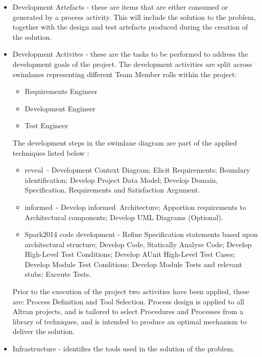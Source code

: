 \documentclass{report}
\newcommand{\spark}[0]{{\sc Spark}}
\newcommand{\reveal}[0]{{\sc reveal}\texttrademark}
\newcommand{\informed}[0]{{\sc informed}}
\begin{document}
\begin{itemize}
\item Development Artefacts - these are items that are either consumed
  or generated by a process activity. This will include the solution
  to the problem, together with the design and test artefacts produced
  during the creation of the solution.

\item Development Activites - these are the tasks to be performed to
  address the development goals of the project. The development
  activities are split across swimlanes representing different Team
  Member rolls within the project:

  \begin{itemize}
  \item Requirements Engineer
  \item Development Engineer
  \item Test Engineer
  \end{itemize}

  The development steps in the swimlane diagram are part of the
  applied techniques listed below :

  \begin{itemize}
  \item \reveal\ - Development Context Diagram; Elicit Requirements;
    Boundary identification; Develop Project Data Model; Develop
    Domain, Specification, Requirements and Satisfaction Argument.

  \item \informed\ - Develop \informed\ Architecture; Apportion
    requirements to Architectural components; Develop UML Diagrams
    (Optional).

  \item \spark 2014 code development - Refine Specification statements
    based upon architectural structure; Develop Code, Statically
    Analyse Code; Develop High-Level Test Conditions; Develop AUnit
    High-Level Test Cases; Develop Module Test Conditions; Develop
    Module Tests and relevant stubs; Exceute Tests.
  \end{itemize}

  Prior to the execution of the project two activities have been
  applied, these are: Process Definition and Tool Selection.  Process
  design is applied to all Altran projects, and is tailored to
  select Procedures and Processes from a library of techniques, and is
  intended to produce an optimal mechanism to deliver the solution.

\item Infrastructure - identifies the tools used in the solution of
  the problem.
\end{itemize}
\end{document}
